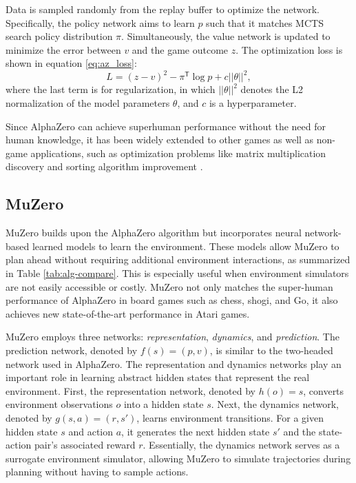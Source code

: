 Data is sampled randomly from the replay buffer to optimize the network.
Specifically, the policy network aims to learn $p$ such that it matches MCTS search policy distribution $\pi$.
Simultaneously, the value network is updated to minimize the error between $v$ and the game outcome $z$.
The optimization loss is shown in equation \eqref{eq:az_loss}:
\begin{equation}\label{eq:az_loss}
L=(z-v)^{2}-\pi^{\mathsf{T}} \log p+c||\theta||^{2},
\end{equation}
where the last term is for regularization, in which $||\theta||^{2}$ denotes the L2 normalization of the model parameters $\theta$, and $c$ is a hyperparameter.

Since AlphaZero can achieve superhuman performance without the need for human knowledge, it has been widely extended to other games \cite{cazenave_polygames_2020, lanctot_openspiel_2020} as well as non-game applications, such as optimization problems
like matrix multiplication discovery \cite{fawzi_discovering_2022} and sorting algorithm improvement \cite{mankowitz_faster_2023}.

\subsection{MuZero}\label{bg:mz}
MuZero \cite{schrittwieser_mastering_2020} builds upon the AlphaZero algorithm but incorporates neural network-based learned models to learn the environment.
These models allow MuZero to plan ahead without requiring additional environment interactions, as summarized in Table \ref{tab:alg-compare}. 
This is especially useful when environment simulators are not easily accessible or costly.
MuZero not only matches the super-human performance of AlphaZero in board games such as chess, shogi, and Go, it also achieves new state-of-the-art performance in Atari games.



MuZero employs three networks: \textit{representation}, \textit{dynamics}, and \textit{prediction}.
The prediction network, denoted by $f(s)=(p,v)$, is similar to the two-headed network used in AlphaZero.
The representation and dynamics networks play an important role in learning abstract hidden states that represent the real environment.
First, the representation network, denoted by $h(o)=s$, converts environment observations $o$ into a hidden state $s$.
Next, the dynamics network, denoted by $g(s,a)=(r,s')$, learns environment transitions. For a given hidden state $s$ and action $a$, it generates the next hidden state $s'$ and the state-action pair's associated reward $r$. 
Essentially, the dynamics network serves as a surrogate environment simulator, allowing MuZero to simulate trajectories during planning without having to sample actions.

